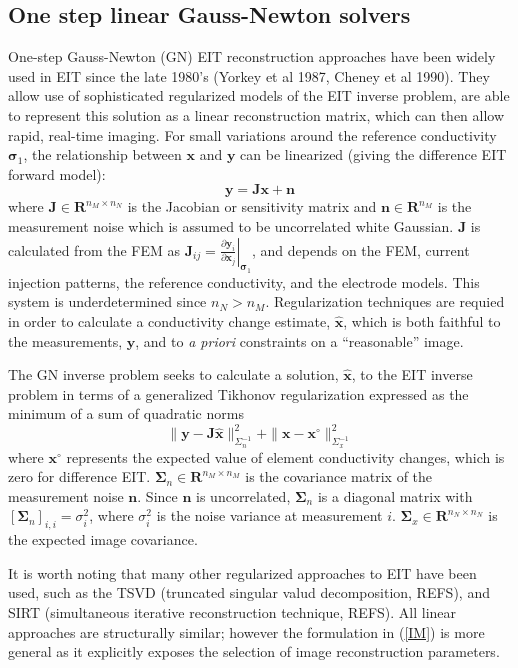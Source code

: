 \documentclass[12pt]{iopart}
\newcommand{\mathbb}{\mathbf}
\newcommand{\xB}{\mbox{$\mathbf{x}$}}
\newcommand{\xH}{\mbox{$\mathbf{\hat x}$}}
\newcommand{\nB}{\mbox{$\mathbf{n}$}}
\newcommand{\yB}{\mbox{$\mathbf{y}$}}
\newcommand{\JB}{\mbox{$\mathbf{J}$}}
\newcommand{\SG}{\mbox{${\mathbf \Sigma}$}}
\newcommand{\sG}{\mbox{${\mathbf \sigma}$}}
\begin{document}
\subsection{One step linear Gauss-Newton solvers}

One-step Gauss-Newton (GN) EIT reconstruction approaches have been
widely used in EIT since the late 1980's (Yorkey et al 1987,
Cheney et al 1990).
They allow use of sophisticated regularized models
of the EIT inverse problem, are able to represent this
solution as a linear reconstruction matrix, which can then allow
rapid, real-time imaging.
For small variations around the reference
conductivity $\sG_1$, the relationship between $\xB$ and $\yB$ can
be linearized (giving the difference EIT forward model):
\begin{equation}\label{FM}
\yB=\JB\xB+\nB
\end{equation}
where
$\JB\in\mathbb{R}^{n_M\times n_N}$ is the Jacobian or sensitivity
matrix and $\nB\in\mathbb{R}^{n_M}$ is the measurement noise which is
assumed to be uncorrelated white Gaussian. $\JB$ is calculated from
the FEM as
$\JB_{ij}=\left.
     \frac{\partial\yB_i}{\partial\xB_j}
          \right|_{\sG_1}$,
and depends on the FEM, current injection patterns, the reference
conductivity, and the electrode models. This system is
underdetermined since $n_N > n_M$. 
Regularization techniques are requied
in order to calculate a conductivity change
estimate, $\xH$, which is both
faithful to the measurements, $\yB$, and to
{\em a priori} constraints on a ``reasonable'' image.

The GN inverse problem seeks to
calculate a solution, $\xH$, to the EIT inverse problem
in terms of a generalized Tikhonov regularization 
expressed as the minimum of a sum of quadratic norms
\begin{equation}\label{IM}
 \|\yB-\JB\xH\|_{\Sigma_n^{-1}}^2 +
 \|\xB-\xB^\circ\|_{\Sigma_x^{-1}}^2
\end{equation}
where $\xB^\circ$ represents the expected value of element
conductivity changes, which is zero for  difference EIT.
$\SG_n\in\mathbb{R}^{n_M\times n_M}$ is
 the covariance matrix of the measurement noise $\nB$. Since
$\nB$ is uncorrelated, $\SG_n$ is a diagonal matrix with
$[\SG_n]_{i,i}=\sigma_i^2$, where $\sigma_i^2$ is the noise variance at
measurement $i$. $\SG_x\in\mathbb{R}^{n_N\times
n_N}$ is the expected image covariance.

It is worth noting that many other regularized approaches
to EIT have been used, such as the
TSVD (truncated singular valud decomposition, REFS),
and
SIRT (simultaneous iterative reconstruction technique, REFS).
All linear approaches are structurally similar; however
the formulation in (\ref{IM}) is more general
as it explicitly exposes the selection of image reconstruction
parameters.
\end{document}

